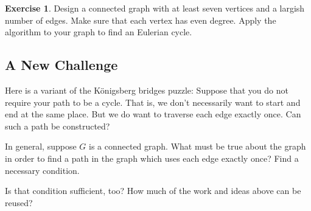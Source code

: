 \documentclass[12pt,letterpaper]{article}
\theoremstyle{definition}
\newtheorem{exercise}[question]{Exercise}
\begin{document}
\begin{exercise}
Design a connected graph with at least seven vertices and a largish number of edges. Make sure that each
vertex has even degree. Apply the algorithm to your graph to find an Eulerian cycle.
\end{exercise}

\subsection*{A New Challenge}

Here is a variant of the K\"{o}nigsberg bridges puzzle: Suppose that you do not require your path to be a cycle.
That is, we don't necessarily want to start and end at the same place. But we do want to traverse each edge
exactly once. Can such a path be constructed?

In general, suppose $G$ is a connected graph. What must be true about the graph in order to find a path 
in the graph which uses each edge exactly once? Find a necessary condition.

Is that condition sufficient, too? How much of the work and ideas above can be reused?


\end{document}
